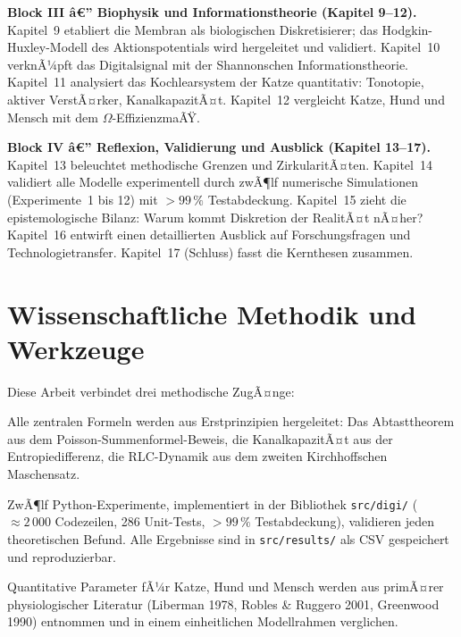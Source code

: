 ﻿\documentclass[12pt,a4paper,titlepage]{report}
\begin{document}
\medskip
\noindent\textbf{Block III â€” Biophysik und Informationstheorie
(Kapitel 9--12).}
Kapitel~9 etabliert die Membran als biologischen Diskretisierer;
das Hodgkin-Huxley-Modell des Aktionspotentials
wird hergeleitet und validiert.
Kapitel~10 verknÃ¼pft das Digitalsignal mit der Shannonschen Informationstheorie.
Kapitel~11 analysiert das Kochlearsystem der Katze quantitativ:
Tonotopie, aktiver VerstÃ¤rker, KanalkapazitÃ¤t.
Kapitel~12 vergleicht Katze, Hund und Mensch mit dem $\Omega$-EffizienzmaÃŸ.

\medskip
\noindent\textbf{Block IV â€” Reflexion, Validierung und Ausblick
(Kapitel 13--17).}
Kapitel~13 beleuchtet methodische Grenzen und ZirkularitÃ¤ten.
Kapitel~14 validiert alle Modelle experimentell durch zwÃ¶lf numerische
Simulationen (Experimente~1 bis 12) mit $>99\,\%$ Testabdeckung.
Kapitel~15 zieht die epistemologische Bilanz:
Warum kommt Diskretion der RealitÃ¤t nÃ¤her?
Kapitel~16 entwirft einen detaillierten Ausblick auf Forschungsfragen
und Technologietransfer.
Kapitel~17 (Schluss) fasst die Kernthesen zusammen.

\section{Wissenschaftliche Methodik und Werkzeuge}

Diese Arbeit verbindet drei methodische ZugÃ¤nge:

\begin{description}[leftmargin=3em, style=nextline]
	\item[Analytisch-deduktiv.]
		Alle zentralen Formeln werden aus Erstprinzipien hergeleitet:
		Das Abtasttheorem aus dem Poisson-Summenformel-Beweis,
		die KanalkapazitÃ¤t aus der Entropiedifferenz,
		die RLC-Dynamik aus dem zweiten Kirchhoffschen Maschensatz.
	\item[Numerisch-experimentell.]
		ZwÃ¶lf Python-Experimente, implementiert in der Bibliothek
		\texttt{src/digi/} ($\approx 2\,000$ Codezeilen, 286 Unit-Tests,
		$>99\,\%$ Testabdeckung), validieren jeden theoretischen Befund.
		Alle Ergebnisse sind in \texttt{src/results/} als CSV gespeichert
		und reproduzierbar.
	\item[Komparativ-biologisch.]
		Quantitative Parameter fÃ¼r Katze, Hund und Mensch werden aus
		primÃ¤rer physiologischer Literatur
		(Liberman 1978, Robles \& Ruggero 2001, Greenwood 1990)
		entnommen und in einem einheitlichen Modellrahmen verglichen.
\end{description}
\end{document}
